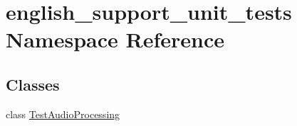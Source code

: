 \hypertarget{namespaceenglish__support__unit__tests}{\section{english\-\_\-support\-\_\-unit\-\_\-tests Namespace Reference}
\label{namespaceenglish__support__unit__tests}
}
\subsection*{Classes}
\begin{DoxyCompactItemize}
\item 
class \hyperlink{classenglish__support__unit__tests_1_1TestAudioProcessing}{Test\-Audio\-Processing}
\end{DoxyCompactItemize}
